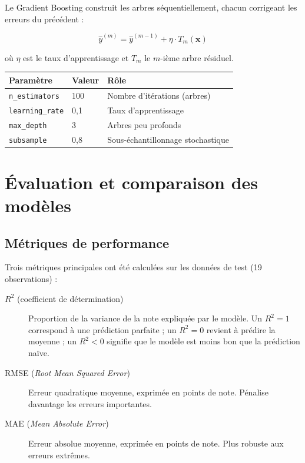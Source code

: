 \documentclass[12pt, a4paper, french]{report}
\begin{document}
Le Gradient Boosting construit les arbres séquentiellement,
chacun corrigeant les erreurs du précédent :

\begin{equation}
  \hat{y}^{(m)} = \hat{y}^{(m-1)} + \eta \cdot T_m(\mathbf{x})
\end{equation}

où $\eta$ est le taux d'apprentissage et $T_m$ le $m$-ième arbre résiduel.

\begin{center}
\begin{tabular}{lll}
\toprule
\textbf{Paramètre} & \textbf{Valeur} & \textbf{Rôle}\\
\midrule
\texttt{n\_estimators}  & 100   & Nombre d'itérations (arbres)\\
\texttt{learning\_rate} & 0,1   & Taux d'apprentissage\\
\texttt{max\_depth}     & 3     & Arbres peu profonds\\
\texttt{subsample}      & 0,8   & Sous-échantillonnage stochastique\\
\bottomrule
\end{tabular}
\end{center}

\chapter{Évaluation et comparaison des modèles}

\section{Métriques de performance}

Trois métriques principales ont été calculées sur les données de test (19 observations) :

\begin{description}
  \item[$R^2$ (coefficient de détermination)]
    Proportion de la variance de la note expliquée par le modèle.
    Un $R^2 = 1$ correspond à une prédiction parfaite ;
    un $R^2 = 0$ revient à prédire la moyenne ;
    un $R^2 < 0$ signifie que le modèle est moins bon que la prédiction naïve.
  \item[RMSE (\textit{Root Mean Squared Error})]
    Erreur quadratique moyenne, exprimée en points de note.
    Pénalise davantage les erreurs importantes.
  \item[MAE (\textit{Mean Absolute Error})]
    Erreur absolue moyenne, exprimée en points de note.
    Plus robuste aux erreurs extrêmes.
\end{description}
\end{document}
